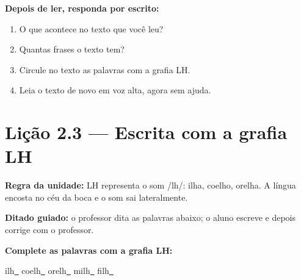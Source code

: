 \textbf{Depois de ler, responda por escrito:}
\begin{enumerate}

  \item O que acontece no texto que você leu?
  \begin{center}
  \underline{\hspace{12cm}}
  \end{center}

  \item Quantas frases o texto tem?
  \begin{center}
  \underline{\hspace{12cm}}
  \end{center}

  \item Circule no texto as palavras com a grafia LH.

  \item Leia o texto de novo em voz alta, agora sem ajuda.

\end{enumerate}

\section{Lição 2.3 --- Escrita com a grafia LH}

\noindent\textbf{Regra da unidade:} LH representa o som /lh/: ilha, coelho, orelha. A língua encosta no céu da boca e o som sai lateralmente.


\noindent\textbf{Ditado guiado:} o professor dita as palavras abaixo; o aluno escreve e depois corrige com o professor.

\begin{center}
  \underline{\hspace{2.3cm}} \quad \underline{\hspace{2.3cm}} \quad \underline{\hspace{2.3cm}} \quad \underline{\hspace{2.3cm}}

  \underline{\hspace{2.3cm}} \quad \underline{\hspace{2.3cm}} \quad \underline{\hspace{2.3cm}} \quad \underline{\hspace{2.3cm}}
\end{center}

\noindent\textbf{Complete as palavras com a grafia LH:}
\begin{center}
  ilh\underline{~} \quad coelh\underline{~} \quad orelh\underline{~} \quad milh\underline{~} \quad filh\underline{~}
\end{center}

